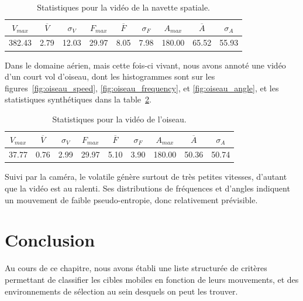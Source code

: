 \begin{table}
	\centering
	\begin{tabular}{c c c c c c c c c}
		$V_{max}$	& $\overline{V}$	& $\sigma_{V}$	& $F_{max}$	& $\overline{F}$	& $\sigma_{F}$	& $A_{max}$	& $\overline{A}$	& $\sigma_{A}$	\bigstrut[b] \\ \hline

		382.43		& 2.79				& 12.03			& 29.97		& 8.05				& 7.98			& 180.00	& 65.52				& 55.93			\bigstrut[t] \\
	\end{tabular}
	\caption[Statistiques pour la vidéo de la navette spatiale]{Statistiques pour la vidéo de la navette spatiale.}
	\label{tab:spaceA_stats}
\end{table}

	Dans le domaine aérien, mais cette fois-ci vivant, nous avons annoté une vidéo d'un court vol d'oiseau, dont les histogrammes sont sur les figures~\ref{fig:oiseau_speed}, \ref{fig:oiseau_frequency}, et \ref{fig:oiseau_angle}, et les statistiques synthétiques dans la table~\ref{tab:oiseau_stats}.
	
\begin{table}
	\centering
	\begin{tabular}{c c c c c c c c c}
		$V_{max}$	& $\overline{V}$	& $\sigma_{V}$	& $F_{max}$	& $\overline{F}$	& $\sigma_{F}$	& $A_{max}$	& $\overline{A}$	& $\sigma_{A}$	\bigstrut[b] \\ \hline

		37.77		& 0.76				& 2.99			& 29.97		& 5.10				& 3.90			& 180.00	& 50.36				& 50.74			\bigstrut[t] \\
	\end{tabular}
	\caption[Statistiques pour la vidéo de l'oiseau]{Statistiques pour la vidéo de l'oiseau.}
	\label{tab:oiseau_stats}
\end{table}

	Suivi par la caméra, le volatile génère surtout de très petites vitesses, d'autant que la vidéo est au ralenti. Ses distributions de fréquences et d'angles indiquent un mouvement de faible pseudo-entropie, donc relativement prévisible.

\section{Conclusion}
	Au cours de ce chapitre, nous avons établi une liste structurée de critères permettant de classifier les cibles mobiles en fonction de leurs mouvements, et des environnements de sélection au sein desquels on peut les trouver.
	
